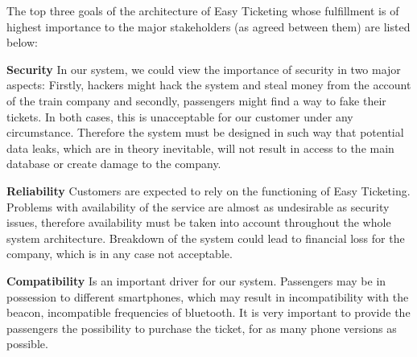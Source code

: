 The top three goals of the architecture of Easy Ticketing whose fulfillment is of highest importance to the major stakeholders (as agreed between them) are listed below:

\textbf{Security} In our system, we could view the importance of security in two major aspects: Firstly, hackers might hack the system and steal money from the account of the train company and secondly, passengers might find a way to fake their tickets. In both cases, this is unacceptable for our customer under any circumstance. Therefore the system must be designed in such way that potential data leaks, which are in theory inevitable, will not result in access to the main database or create damage to the company.

\textbf{Reliability}  Customers are expected to rely on the functioning of Easy Ticketing. Problems with availability of the service are almost as undesirable as security issues, therefore availability must be taken into account throughout the whole system architecture. Breakdown of the system could lead to financial loss for the company, which is in any case not acceptable.

\textbf{Compatibility} Is an important driver for our system. Passengers may be in possession to different smartphones, which may result in incompatibility with the beacon, incompatible frequencies of bluetooth. It is very important to provide the passengers the possibility to purchase the ticket, for as many phone versions as possible.
